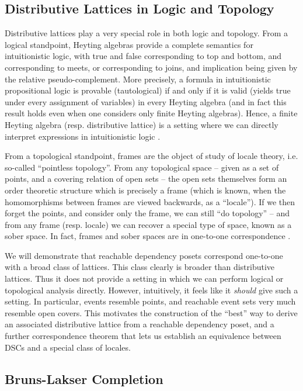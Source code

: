 \documentclass[hoptionsi,review,screen,format=sigconf]{acmart}
\theoremstyle{definition}
\begin{document}
\subsection{Distributive Lattices in Logic and Topology}

Distributive lattices play a very special role in both logic and topology. From a logical standpoint, Heyting algebras provide a complete semantics for intuitionistic logic, with true and false corresponding to top and bottom, and corresponding to meets, or corresponding to joins, and implication being given by the relative pseudo-complement. More precisely, a formula in intuitionistic propositional logic is provable (tautological) if and only if it is valid (yields true under every assignment of variables) in every Heyting algebra (and in fact this result holds even when one considers only finite Heyting algebras). Hence, a finite Heyting algebra (resp. distributive lattice) is a setting where we can directly interpret expressions in intuitionistic logic \cite{van1988troelstra}.

From a topological standpoint, frames are the object of study of locale theory, i.e. so-called ``pointless topology''. From any topological space -- given as a set of points, and a covering relation of open sets -- the open sets themselves form an order theoretic structure which is precisely a frame (which is known, when the homomorphisms between frames are viewed backwards, as a ``locale''). If we then forget the points, and consider only the frame, we can still ``do topology'' -- and from any frame (resp. locale) we can recover a special type of space, known as a sober space. In fact, frames and sober spaces are in one-to-one correspondence \cite{johnstone1982stone, vickers1996topology}.

We will demonstrate that reachable dependency posets correspond one-to-one with a broad class of lattices. This class clearly is broader than distributive lattices. Thus it does not provide a setting in which we can perform logical or topological analysis directly. However, intuitively, it feels like it \textit{should} give such a setting. In particular, events resemble points, and reachable event sets very much resemble open covers. This motivates the construction of the ``best'' way to derive an associated distributive lattice from a reachable dependency poset, and a further correspondence theorem that lets us establish an equivalence between DSCs and a special class of locales.

\subsection{Bruns-Lakser Completion}
\end{document}
